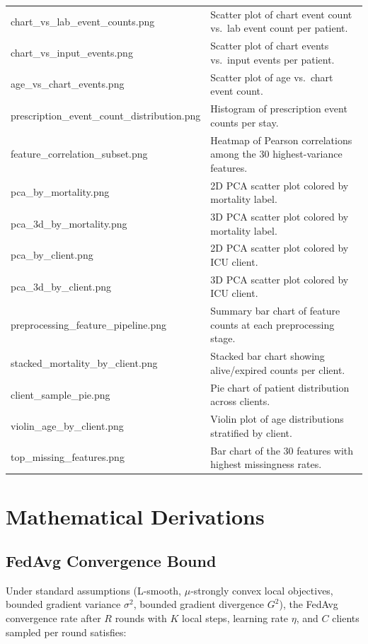\documentclass[11pt,a4paper]{report}
\begin{document}
\begin{longtable}{p{6cm}p{8cm}}
chart\_vs\_lab\_event\_counts.png & Scatter plot of chart event count vs.\ lab event count per patient. \\
chart\_vs\_input\_events.png & Scatter plot of chart events vs.\ input events per patient. \\
age\_vs\_chart\_events.png & Scatter plot of age vs.\ chart event count. \\
prescription\_event\_count\_distribution.png & Histogram of prescription event counts per stay. \\
feature\_correlation\_subset.png & Heatmap of Pearson correlations among the 30 highest-variance features. \\
pca\_by\_mortality.png & 2D PCA scatter plot colored by mortality label. \\
pca\_3d\_by\_mortality.png & 3D PCA scatter plot colored by mortality label. \\
pca\_by\_client.png & 2D PCA scatter plot colored by ICU client. \\
pca\_3d\_by\_client.png & 3D PCA scatter plot colored by ICU client. \\
preprocessing\_feature\_pipeline.png & Summary bar chart of feature counts at each preprocessing stage. \\
stacked\_mortality\_by\_client.png & Stacked bar chart showing alive/expired counts per client. \\
client\_sample\_pie.png & Pie chart of patient distribution across clients. \\
violin\_age\_by\_client.png & Violin plot of age distributions stratified by client. \\
top\_missing\_features.png & Bar chart of the 30 features with highest missingness rates. \\
\bottomrule
\end{longtable}


\chapter{Mathematical Derivations}

\section{FedAvg Convergence Bound}

Under standard assumptions (L-smooth, $\mu$-strongly convex local objectives, bounded gradient variance $\sigma^2$, bounded gradient divergence $G^2$), the FedAvg convergence rate after $R$ rounds with $K$ local steps, learning rate $\eta$, and $C$ clients sampled per round satisfies:
\end{document}
